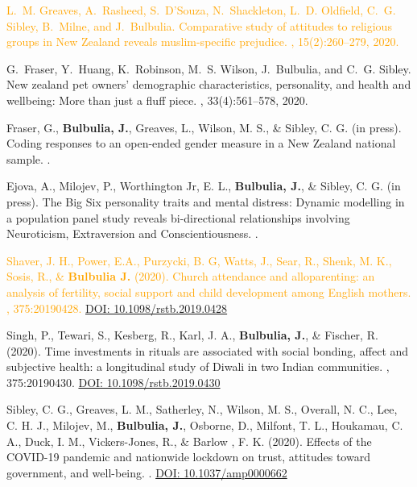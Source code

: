 \documentclass{article}
\begin{document}
\begin{thebibliography}{99}
\textcolor{Orange}{L.~M. Greaves, A.~Rasheed, S.~D'Souza, N.~Shackleton, L.~D. Oldfield, C.~G.
  Sibley, B.~Milne, and J.~Bulbulia.
\newblock Comparative study of attitudes to religious groups in New Zealand
  reveals muslim-specific prejudice.
,
  15(2):260--279, 2020.}

G.~Fraser, Y.~Huang, K.~Robinson, M.~S. Wilson, J.~Bulbulia, and C.~G. Sibley.
\newblock New zealand pet owners' demographic characteristics, personality, and
  health and wellbeing: More than just a fluff piece.
, 33(4):561--578, 2020.


 Fraser, G., {\bf Bulbulia, J.}, Greaves, L., Wilson, M. S., \& Sibley, C. G. (in press). 
\newblock Coding responses to an open-ended gender measure in a New Zealand national sample.
. 


 Ejova, A., Milojev, P., Worthington Jr, E. L., {\bf Bulbulia, J.}, \& Sibley, C. G. (in press). 
\newblock The Big Six personality traits and mental distress: Dynamic modelling in a population panel study reveals bi-directional relationships involving Neuroticism, Extraversion and Conscientiousness.
. 



 \textcolor{Orange}{Shaver, J. H., Power, E.A., Purzycki, B. G, Watts, J., Sear, R., Shenk, M. K., Sosis, R., \& {\bf Bulbulia J.} (2020). 
\newblock Church attendance and alloparenting: an analysis of fertility, social support and child development among English mothers. 
, 375:20190428.
\href{http://dx.doi.org/10.1098/rstb.2019.0428}{DOI: 10.1098/rstb.2019.0428}}


 Singh, P., Tewari, S., Kesberg, R., Karl, J. A., {\bf Bulbulia, J.}, \& Fischer, R. (2020). 
\newblock Time investments in rituals are associated with social bonding, affect and subjective health: a longitudinal study of Diwali in two Indian communities. 
, 375:20190430.
\href{http://dx.doi.org/10.1098/rstb.2019.0430}{DOI: 10.1098/rstb.2019.0430}


 Sibley, C. G., Greaves, L. M., Satherley, N., Wilson, M. S., Overall, N. C., Lee, C. H. J., Milojev, M., {\bf Bulbulia, J.}, Osborne, D., Milfont, T. L., Houkamau, C. A., Duck, I. M., Vickers-Jones, R., \& Barlow , F. K. (2020).
\newblock Effects of the COVID-19 pandemic and nationwide lockdown on trust, attitudes toward government, and well-being. 
.
\href{http://dx.doi.org/10.1037/amp0000662}{DOI: 10.1037/amp0000662}



\end{thebibliography}
\end{document}
